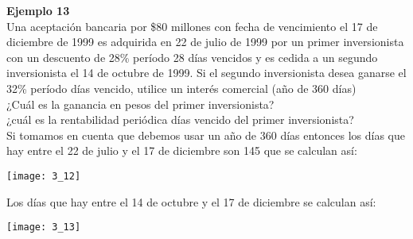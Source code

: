 	\textbf{Ejemplo 13}\\
	
	Una aceptación bancaria por \$80 millones con fecha de vencimiento el 17 de diciembre de 1999 es adquirida en 22 de julio de 1999 por un primer inversionista con un descuento de 28\% período 28 días vencidos y es cedida a un segundo inversionista el 14 de octubre de 1999. Si el segundo inversionista desea ganarse el 32\% período días vencido, utilice un interés comercial (año de 360 días) \\
	¿Cuál es la ganancia en pesos del primer inversionista? \\
	¿cuál es la rentabilidad periódica días vencido del primer inversionista? \\
	
	Si tomamos en cuenta que debemos usar un año de 360 días entonces los días que hay entre el 22 de julio y el 17 de diciembre son 145 que se calculan así: \\
	
	\begin{center}
		\texttt{[image: 3\_12]}
	\end{center}
	
	Los días que hay entre el 14 de octubre y el 17 de diciembre se calculan así:
	

	\begin{center}
		\texttt{[image: 3\_13]}
	\end{center}
	
